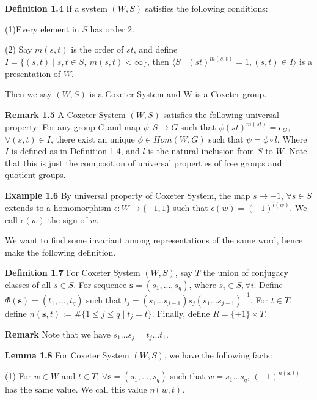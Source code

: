 \documentclass[../main.tex]{subfiles}
\begin{document}
\vspace{\baselineskip}
\noindent \textbf{Definition 1.4} If a system $(W,S)$ satisfies the following conditions:

\indent (1)Every element in $S$ has order 2.

\indent (2) Say $m(s,t)$ is the order of $st$, and define $I = \{ (s,t) \mid s,t \in S,\ m(s,t) < \infty \}$, then $\langle S \mid (st)^{m(s,t)}=1,(s,t)\in I \rangle$ is a presentation of $W$.

Then we say $(W,S)$ is a Coxeter System and W is a Coxeter group.

\vspace{\baselineskip}
\noindent \textbf{Remark 1.5} A Coxeter System $(W,S)$ satisfies the following universal property: For any group $G$ and map $\psi:S \rightarrow G$ such that $\psi(st) ^{m(st)}=e_G$,$\forall(s,t) \in I$, there exist an unique $\phi \in Hom(W,G)$ such that $\psi=\phi \circ l$. Where $I$ is defined as in Definition 1.4, and $l$ is the natural inclusion from $S$ to $W$. Note that this is just the composition of universal properties of free groups and quotient groups.

\vspace{\baselineskip}
\noindent \textbf{Example 1.6} By universal property of Coxeter System, the map $s \mapsto -1$, $\forall s \in S$ extends to a homomorphism $\epsilon :W \rightarrow \{-1,1\}$ such that $\epsilon(w)=(-1)^{l(w)}$. We call $\epsilon(w)$ the sign of $w$. 

\vspace{\baselineskip}
We want to find some invariant among representations of the same word, hence make the following definition.

\vspace{\baselineskip}
\noindent \textbf{Definition 1.7} For Coxeter System $(W,S)$, say $T$ the union of conjugacy classes of all $s \in S$. For sequence $\mathbf{s}=(s_1,...,s_q)$, where $s_i \in S,\forall i$. Define $\Phi(\mathbf{s})=(t_1,...,t_q)$ such that $t_j=(s_1...s_{j-1})s_j(s_1...s_{j-1})^{-1}$. For $t\in T$, define $n(\mathbf{s},t):= \# \{1\le j \le q \mid t_j=t\}$. Finally, define $R=\{\pm 1\} \times T$.

\noindent \textbf{Remark} Note that we have $s_1...s_j=t_j...t_1$.

\vspace{\baselineskip}
\noindent \textbf{Lemma 1.8}  For Coxeter System $(W,S)$, we have the following facts:

\indent (1) For $w \in W$ and $t \in T$, $\forall \mathbf{s}=(s_1,...,s_q)$ such that $w=s_1...s_q$, $(-1)^{n(\mathbf{s},t)}$ has the same value. We call this value $\eta(w,t)$.
\end{document}

